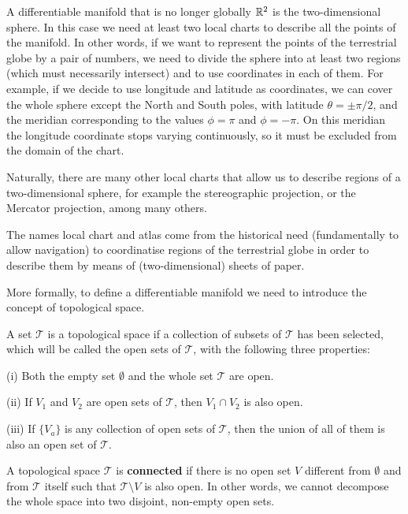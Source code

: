 \begin{points}
\item A differentiable manifold that is no longer globally $\mathbb{R}^2$ is the two-dimensional sphere. In this case we need at least two local charts to describe all the points of the manifold. In other words, if we want to represent the points of the terrestrial globe by a pair of numbers, we need to divide the sphere into at least two regions (which must necessarily intersect) and to use coordinates in each of them. For example, if we decide to use longitude and latitude as coordinates, we can cover the whole sphere except the North and South poles, with latitude $\theta=\pm\pi/2$, and the meridian corresponding to the values $\phi=\pi$ and $\phi=-\pi$. On this meridian the longitude coordinate stops varying continuously, so it must be excluded from the domain of the chart.

\item Naturally, there are many other local charts that allow us to describe regions of a two-dimensional sphere, for example the stereographic projection, or the Mercator projection, among many others.

\item The names local chart and atlas come from the historical need (fundamentally to allow navigation) to coordinatise regions of the terrestrial globe in order to describe them by means of (two-dimensional) sheets of paper.

\item More formally, to define a differentiable manifold we need to introduce the concept of topological space.

\item A set $\mathcal T$ is a topological space if a collection of subsets of $\mathcal T$ has been selected, which will be called the open sets of $\mathcal T$, with the following three properties:

(i) Both the empty set $\emptyset$ and the whole set $\mathcal T$ are open.

(ii) If $V_1$ and $V_2$ are open sets of $\mathcal T$, then $V_1\cap V_2$ is also open.

(iii) If $\{V_a\}$ is any collection of open sets of $\mathcal T$, then the union of all of them is also an open set of $\mathcal T$.

\item A topological space $\mathcal T$ is \textbf{connected} if there is no open set $V$ different from $\emptyset$ and from $\mathcal T$ itself such that $\mathcal T\setminus V$ is also open. In other words, we cannot decompose the whole space into two disjoint, non-empty open sets.


\end{points}

